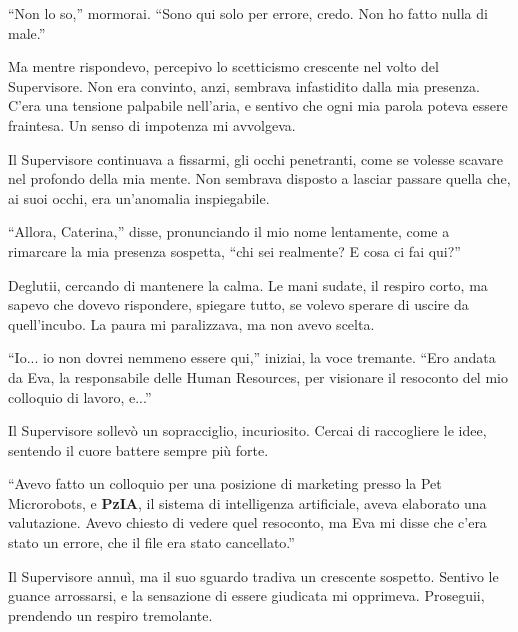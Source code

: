 \begin{dialogue}
 \enquote{Non lo so,} mormorai. \enquote{Sono qui solo per errore, credo. Non ho fatto nulla di male.}
\end{dialogue}

Ma mentre rispondevo, percepivo lo scetticismo crescente nel volto del Supervisore. Non era convinto, anzi, sembrava infastidito dalla mia presenza. C'era una tensione palpabile nell'aria, e sentivo che ogni mia parola poteva essere fraintesa. Un senso di impotenza mi avvolgeva.

Il Supervisore continuava a fissarmi, gli occhi penetranti, come se volesse scavare nel profondo della mia mente. Non sembrava disposto a lasciar passare quella che, ai suoi occhi, era un'anomalia inspiegabile.

\begin{dialogue}
 \enquote{Allora, Caterina,} disse, pronunciando il mio nome lentamente, come a rimarcare la mia presenza sospetta, \enquote{chi sei realmente? E cosa ci fai qui?}
\end{dialogue}

Deglutii, cercando di mantenere la calma. Le mani sudate, il respiro corto, ma sapevo che dovevo rispondere, spiegare tutto, se volevo sperare di uscire da quell'incubo. La paura mi paralizzava, ma non avevo scelta.

\begin{dialogue}
 \enquote{Io... io non dovrei nemmeno essere qui,} iniziai, la voce tremante. \enquote{Ero andata da Eva, la responsabile delle Human Resources, per visionare il resoconto del mio colloquio di lavoro, e...}
\end{dialogue}

Il Supervisore sollevò un sopracciglio, incuriosito. Cercai di raccogliere le idee, sentendo il cuore battere sempre più forte.

\begin{dialogue}
 \enquote{Avevo fatto un colloquio per una posizione di marketing presso la Pet Microrobots, e \textbf{PzIA}, il sistema di intelligenza artificiale, aveva elaborato una valutazione. Avevo chiesto di vedere quel resoconto, ma Eva mi disse che c'era stato un errore, che il file era stato cancellato.}
\end{dialogue}

Il Supervisore annuì, ma il suo sguardo tradiva un crescente sospetto. Sentivo le guance arrossarsi, e la sensazione di essere giudicata mi opprimeva. Proseguii, prendendo un respiro tremolante.

